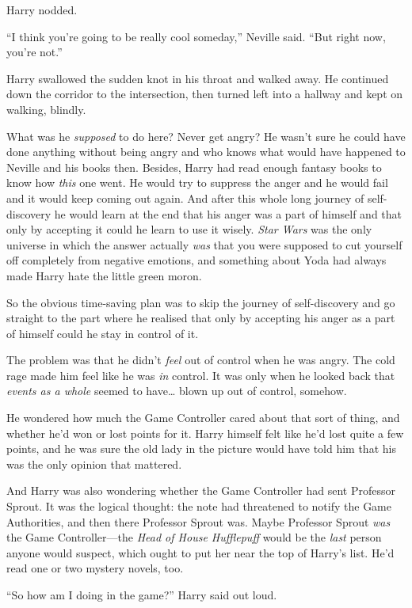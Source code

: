 Harry nodded.

``I think you're going to be really cool someday,'' Neville said. ``But
right now, you're not.''

Harry swallowed the sudden knot in his throat and walked away. He
continued down the corridor to the intersection, then turned left into a
hallway and kept on walking, blindly.

What was he \emph{supposed} to do here? Never get angry? He wasn't sure
he could have done anything without being angry and who knows what would
have happened to Neville and his books then. Besides, Harry had read
enough fantasy books to know how \emph{this} one went. He would try to
suppress the anger and he would fail and it would keep coming out again.
And after this whole long journey of self-discovery he would learn at
the end that his anger was a part of himself and that only by accepting
it could he learn to use it wisely. \emph{Star Wars} was the only
universe in which the answer actually \emph{was} that you were supposed
to cut yourself off completely from negative emotions, and something
about Yoda had always made Harry hate the little green moron.

So the obvious time-saving plan was to skip the journey of
self-discovery and go straight to the part where he realised that only
by accepting his anger as a part of himself could he stay in control of
it.

The problem was that he didn't \emph{feel} out of control when he was
angry. The cold rage made him feel like he was \emph{in} control. It was
only when he looked back that \emph{events as a whole} seemed to
have\ldots{} blown up out of control, somehow.

He wondered how much the Game Controller cared about that sort of thing,
and whether he'd won or lost points for it. Harry himself felt like he'd
lost quite a few points, and he was sure the old lady in the picture
would have told him that his was the only opinion that mattered.

And Harry was also wondering whether the Game Controller had sent
Professor Sprout. It was the logical thought: the note had threatened to
notify the Game Authorities, and then there Professor Sprout was. Maybe
Professor Sprout \emph{was} the Game Controller---the \emph{Head of
House Hufflepuff} would be the \emph{last} person anyone would suspect,
which ought to put her near the top of Harry's list. He'd read one or
two mystery novels, too.

``So how am I doing in the game?'' Harry said out loud.

